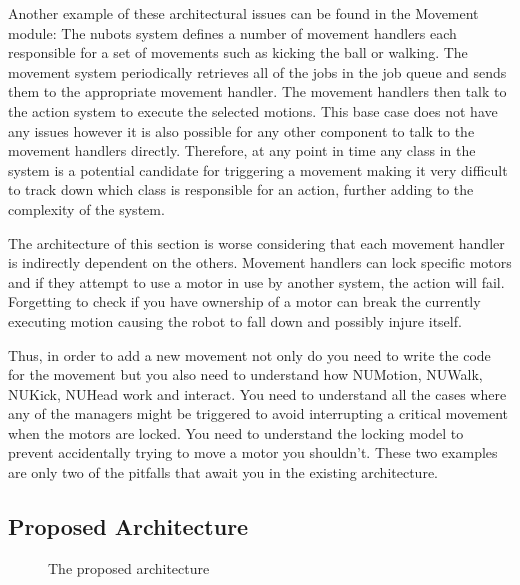 \documentclass[english,12pt]{scrartcl}
\begin{document}
			Another example of these architectural issues can be found in the Movement module:
			The \gls{nubots} system defines a number of movement handlers each responsible for a set of movements such as kicking the ball or walking.
			The movement system periodically retrieves all of the jobs in the job queue and sends them to the appropriate movement handler. 
			The movement handlers then talk to the action system to execute the selected motions. 
			This base case does not have any issues however it is also possible for any other component to talk to the movement handlers directly.
			Therefore, at any point in time any class in the system is a potential candidate for triggering a movement making it very difficult to track down which class is responsible for an action, further adding to the complexity of the system.

			The architecture of this section is worse considering that each movement handler is indirectly dependent on the others.
			Movement handlers can lock specific motors and if they attempt to use a motor in use by another system, the action will fail.
			Forgetting to check if you have ownership of a motor can break the currently executing motion causing the robot to fall down and possibly injure itself.

			Thus, in order to add a new movement not only do you need to write the code for the movement
			but you also need to understand how NUMotion, NUWalk, NUKick, NUHead work and interact.
			You need to understand all the cases where any of the managers might be triggered to avoid interrupting a critical movement when the motors are locked.
			You need to understand the locking model to prevent accidentally trying to move a motor you shouldn't.
			These two examples are only two of the pitfalls that await you in the existing architecture.
			
		\subsection{Proposed Architecture}
			\begin{figure}[h]
				\centering
				\caption {The proposed architecture}
				\label{fig:HighLevelProposedArchitecture}
			\end{figure}
\end{document}
